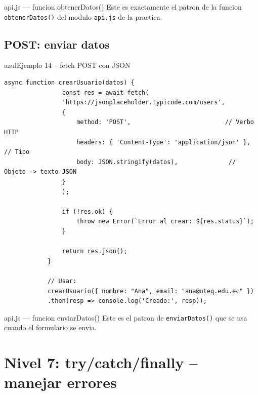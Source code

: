 \documentclass[11pt,a4paper]{article}
\newcounter{nej}\setcounter{nej}{0}
\begin{document}
	\begin{cajapractica}{api.js --- funcion obtenerDatos()}
		Este es exactamente el patron de la funcion \texttt{obtenerDatos()} del modulo \texttt{api.js} de la practica.
	\end{cajapractica}
	
	\subsection{POST: enviar datos}
	
	\begin{cajacodigo}{azul}{Ejemplo 14 -- fetch POST con JSON}
		\begin{lstlisting}[style=codejs]
			async function crearUsuario(datos) {
				const res = await fetch(
				'https://jsonplaceholder.typicode.com/users',
				{
					method: 'POST',                          // Verbo HTTP
					headers: { 'Content-Type': 'application/json' }, // Tipo
					body: JSON.stringify(datos),              // Objeto -> texto JSON
				}
				);
				
				if (!res.ok) {
					throw new Error(`Error al crear: ${res.status}`);
				}
				
				return res.json();
			}
			
			// Usar:
			crearUsuario({ nombre: "Ana", email: "ana@uteq.edu.ec" })
			.then(resp => console.log('Creado:', resp));
		\end{lstlisting}
	\end{cajacodigo}
	
	\begin{cajapractica}{api.js --- funcion enviarDatos()}
		Este es el patron de \texttt{enviarDatos()} que se usa cuando el formulario se envia.
	\end{cajapractica}
	
	\section{Nivel 7: try/catch/finally -- manejar errores}
	
\end{document}
